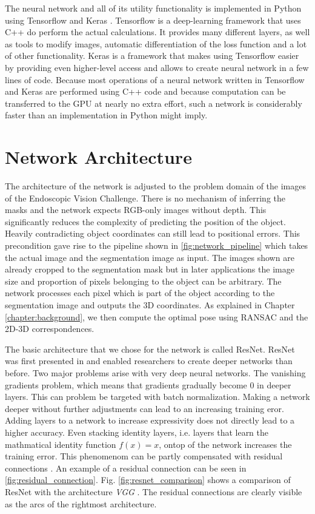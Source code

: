 The neural network and all of its utility functionality is implemented in Python using Tensorflow \cite{tensorflow} and Keras \cite{keras}. Tensorflow is a deep-learning framework that uses C++ do perform the actual calculations. It provides many different layers, as well as tools to modify images, automatic differentiation of the loss function and a lot of other functionality. Keras is a framework that makes using Tensorflow easier by providing even higher-level access and allows to create neural network in a few lines of code. Because most operations of a neural network written in Tensorflow and Keras are performed using C++ code and because computation can be transferred to the GPU at nearly no extra effort, such a network is considerably faster than an implementation in Python might imply.

\section{Network Architecture}

The architecture of the network is adjusted to the problem domain of the images of the Endoscopic Vision Challenge. There is no mechanism of inferring the masks and the network expects RGB-only images without depth. This significantly reduces the complexity of predicting the position of the object. Heavily contradicting object coordinates can still lead to positional errors. This precondition gave rise to the pipeline shown in \fig \ref{fig:network_pipeline} which takes the actual image and the segmentation image as input. The images shown are already cropped to the segmentation mask but in later applications the image size and proportion of pixels belonging to the object can be arbitrary. The network processes each pixel which is part of the object according to the segmentation image and outputs the 3D coordinates. As explained in Chapter \ref{chapter:background}, we then compute the optimal pose using RANSAC and the 2D-3D correspondences.

The basic architecture that we chose for the network is called ResNet. ResNet was first presented in \cite{resnet} and enabled researchers to create deeper networks than before. Two major problems arise with very deep neural networks. The vanishing gradients problem, which means that gradients gradually become 0 in deeper layers. This can problem be targeted with batch normalization. Making a network deeper without further adjustments can lead to an increasing training eror. Adding layers to a network to increase expressivity does not directly lead to a higher accuracy. Even stacking identity layers, i.e. layers that learn the mathmatical identity function $f(x) = x$, ontop of the network increases the training error. This phenomenom can be partly compensated with residual connections \cite{resnet}. An example of a residual connection can be seen in \fig \ref{fig:residual_connection}. Fig. \ref{fig:resnet_comparison} shows a comparison of ResNet with the architecture \textit{VGG} \cite{vgg}. The residual connections are clearly visible as the arcs of the rightmost architecture.

